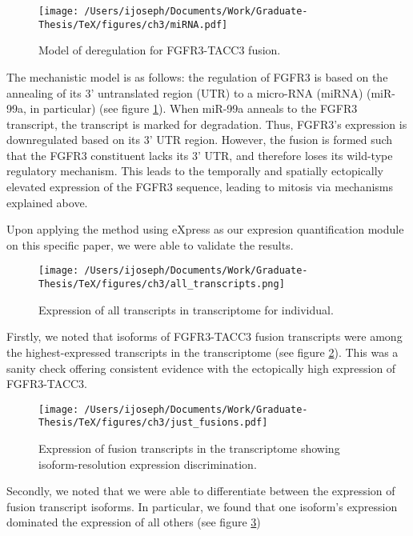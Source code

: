 \begin{figure}
  \centering \texttt{[image: /Users/ijoseph/Documents/Work/Graduate-Thesis/TeX/figures/ch3/miRNA.pdf]}
  \caption{Model of deregulation for FGFR3-TACC3
    fusion.} \label{threeone}
\end{figure}


The mechanistic model is as follows: the regulation of FGFR3 is based on the annealing of its 3' untranslated region (UTR) to a micro-RNA (miRNA) (miR-99a, in particular) (see figure \ref{threeone}). When miR-99a anneals to the FGFR3 transcript, the transcript is marked for degradation. Thus, FGFR3's expression is downregulated based on its 3' UTR region. However, the fusion is formed such that the FGFR3 constituent lacks its 3' UTR, and therefore loses its wild-type regulatory mechanism. This leads to the temporally and spatially ectopically elevated expression of the FGFR3 sequence, leading to mitosis via mechanisms explained above.


Upon applying the method using eXpress as our expresion quantification module\cite{roberts_streaming_2013} on this specific paper, we were able to validate the results.

\begin{figure}
  \centering \texttt{[image: /Users/ijoseph/Documents/Work/Graduate-Thesis/TeX/figures/ch3/all\_transcripts.png]}
  \caption{Expression of all transcripts in transcriptome for
    individual.} \label{threetwo}
\end{figure}


Firstly, we noted that isoforms of FGFR3-TACC3 fusion transcripts were among the highest-expressed transcripts in the transcriptome (see figure \ref{threetwo}). This was a sanity check offering consistent evidence with the ectopically high expression of FGFR3-TACC3.


\begin{figure}
  \centering \texttt{[image: /Users/ijoseph/Documents/Work/Graduate-Thesis/TeX/figures/ch3/just\_fusions.pdf]}
  \caption{Expression of fusion transcripts in the transcriptome showing isoform-resolution expression discrimination.} \label{threethree}
\end{figure}



Secondly, we noted that we were able to differentiate between the expression of fusion transcript isoforms. In particular, we found that one isoform's expression dominated the expression of all others (see figure \ref{threethree})


